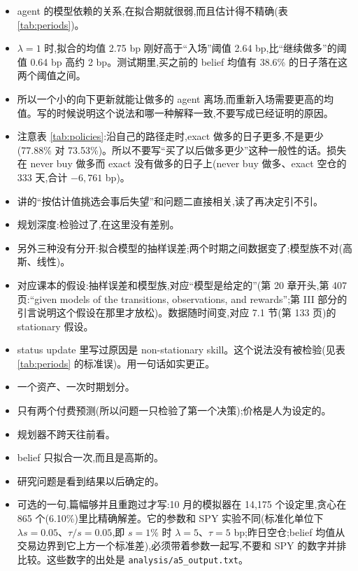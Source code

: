 \documentclass{article}
\newenvironment{pts}{\begin{itemize}[nosep,leftmargin=1.15em,topsep=1pt]}{\end{itemize}}
\begin{document}
\begin{note}
\begin{pts}
\item agent 的模型依赖的关系,在拟合期就很弱,而且估计得不精确(表 \ref{tab:periods})。
\item $\lambda=1$ 时,拟合的均值 2.75 bp 刚好高于``入场''阈值 2.64 bp,比``继续做多''的阈值 0.64 bp 高约 2 bp。测试期里,买之前的 belief 均值有 38.6\% 的日子落在这两个阈值之间。
\item 所以一个小的向下更新就能让做多的 agent 离场,而重新入场需要更高的均值。写的时候说明这个说法和哪一种解释一致,不要写成已经证明的原因。
\item 注意表 \ref{tab:policies}:沿自己的路径走时,exact 做多的日子更多,不是更少(77.88\% 对 73.53\%)。所以不要写``买了以后做多更少''这种一般性的话。损失在 never buy 做多而 exact 没有做多的日子上(never buy 做多、exact 空仓的 333 天,合计 $-6{,}761$ bp)。
\item \citet{smith2006optimizer} 讲的``按估计值挑选会事后失望''和问题二直接相关,读了再决定引不引。
\end{pts}
\end{note}

\begin{note}
\begin{pts}
\item 规划深度:检验过了,在这里没有差别。
\item 另外三种没有分开:拟合模型的抽样误差;两个时期之间数据变了;模型族不对(高斯、线性)。
\item 对应课本的假设:抽样误差和模型族,对应``模型是给定的''(第 20 章开头,第 407 页:``given models of the transitions, observations, and rewards'';第 III 部分的引言说明这个假设在那里才放松)。数据随时间变,对应 7.1 节(第 133 页)的 stationary 假设。
\item status update 里写过原因是 non-stationary skill。这个说法没有被检验(见表 \ref{tab:periods} 的标准误)。用一句话如实更正。
\end{pts}
\end{note}

\begin{note}
\begin{pts}
\item 一个资产、一次时期划分。
\item 只有两个付费预测(所以问题一只检验了第一个决策);价格是人为设定的。
\item 规划器不跨天往前看。
\item belief 只拟合一次,而且是高斯的。
\item 研究问题是看到结果以后确定的。
\item 可选的一句,篇幅够并且重跑过才写:10 月的模拟器在 14{,}175 个设定里,贪心在 865 个(6.10\%)里比精确解差。它的参数和 SPY 实验不同(标准化单位下 $\lambda s = 0.05$、$\tau/s = 0.05$,即 $s=1\%$ 时 $\lambda=5$、$\tau=5$ bp;昨日空仓;belief 均值从交易边界到它上方一个标准差),必须带着参数一起写,不要和 SPY 的数字并排比较。这些数字的出处是 \texttt{analysis/a5\_output.txt}。
\end{pts}
\end{note}
\end{document}
